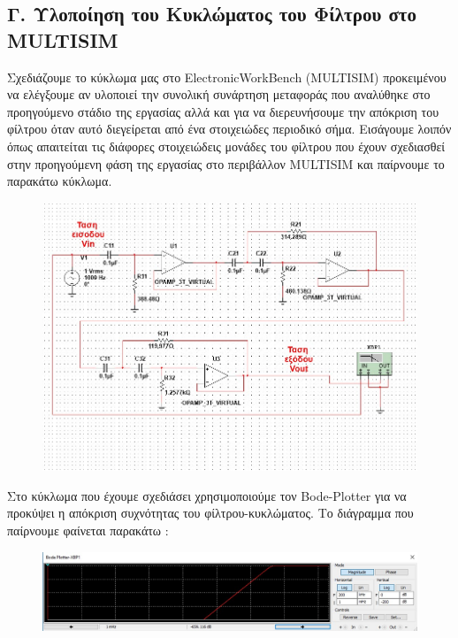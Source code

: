 \documentclass{article}
\begin{document}
{{{\subsection*{Γ. Υλοποίηση του Κυκλώματος του Φίλτρου στο MULTISIM}
\large{}
Σχεδιάζουμε το κύκλωμα μας στο ElectronicWorkBench (MULTISIM) προκειμένου να ελέγξουμε αν υλοποιεί την συνολική συνάρτηση μεταφοράς που αναλύθηκε στο προηγούμενο στάδιο της εργασίας αλλά και για να διερευνήσουμε την απόκριση του φίλτρου όταν αυτό διεγείρεται από ένα στοιχειώδες περιοδικό σήμα.
Εισάγουμε λοιπόν όπως απαιτείται τις διάφορες στοιχειώδεις μονάδες του φίλτρου που έχουν σχεδιασθεί στην προηγούμενη φάση της εργασίας στο περιβάλλον MULTISIM και παίρνουμε το παρακάτω κύκλωμα.
\begin{figure}[h!]
\centering
 	\advance\leftskip-3cm
  \includegraphics[width=180mm,scale=2]{thema4/ilop.jpg}
\end{figure} 
\clearpage
Στο κύκλωμα που έχουμε σχεδιάσει χρησιμοποιούμε τον Bode-Plotter για να προκύψει η απόκριση συχνότητας του φίλτρου-κυκλώματος. Το διάγραμμα που παίρνουμε φαίνεται παρακάτω :
\begin{figure}[h!]
\centering
 	\advance\leftskip-4cm
  \includegraphics[width=200mm,scale=2]{thema4/multisim0.jpg}
\end{figure} \\
}}}
\end{document}

